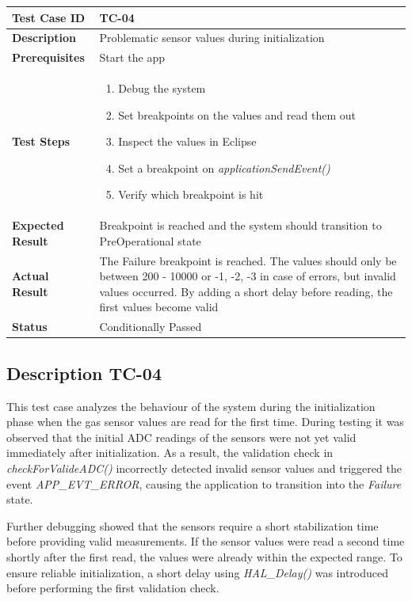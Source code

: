 \renewcommand{\arraystretch}{1.4}

\begin{table}[h]
\centering
\begin{tabular}{|p{}|p{}|}
\hline
\textbf{Test Case ID} & TC-04 \\ \hline
\textbf{Description} & Problematic sensor values during initialization \\ \hline
\textbf{Prerequisites} & Start the app \\ \hline
\textbf{Test Steps} &
\begin{enumerate}
\item Debug the system
\item Set breakpoints on the values and read them out
\item Inspect the values in Eclipse
\item Set a breakpoint on \textit{applicationSendEvent()}
\item Verify which breakpoint is hit
\end{enumerate}
\\ \hline
\textbf{Expected Result} & Breakpoint is reached and the system should transition to PreOperational state \\ \hline
\textbf{Actual Result} & The Failure breakpoint is reached. The values should only be between 200 - 10000 or -1, -2, -3 in case of errors, but invalid values occurred. By adding a short delay before reading, the first values become valid \\ \hline
\textbf{Status} & \textcolor{green!60!black}{Conditionally Passed} \\ \hline
\end{tabular}
\end{table}
\newpage
\subsection{Description TC-04}
This test case analyzes the behaviour of the system during the initialization phase when the gas sensor values are read for the first time. 
During testing it was observed that the initial ADC readings of the sensors were not yet valid immediately after initialization. 
As a result, the validation check in \textit{checkForValideADC()} incorrectly detected invalid sensor values and triggered the event 
\textit{APP\_EVT\_ERROR}, causing the application to transition into the \textit{Failure} state.

Further debugging showed that the sensors require a short stabilization time before providing valid measurements. 
If the sensor values were read a second time shortly after the first read, the values were already within the expected range. 
To ensure reliable initialization, a short delay using \textit{HAL\_Delay()} was introduced before performing the first validation check.

